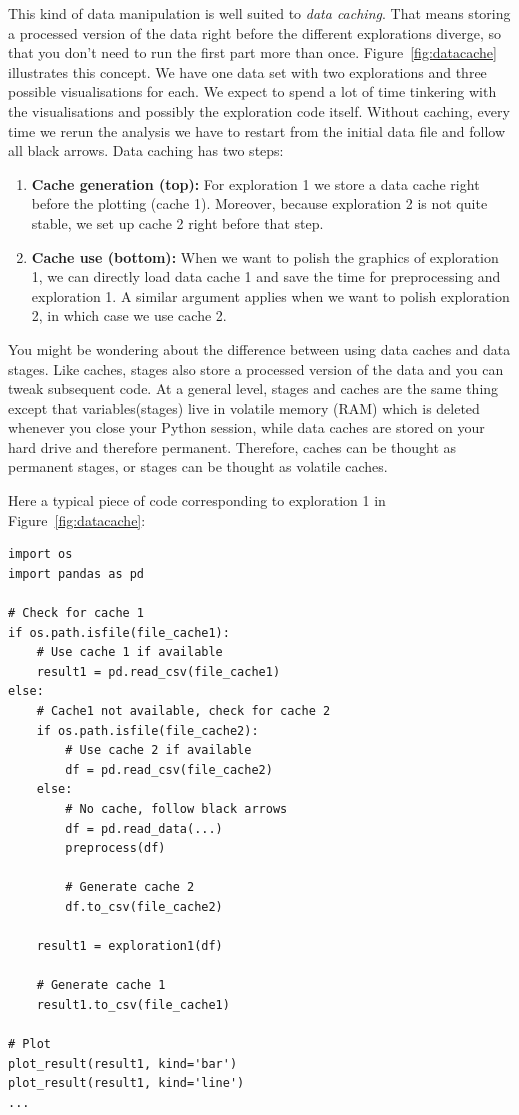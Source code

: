 \documentclass[12pt,a4paper,notitlepage,onecolumn]{article}
\begin{document}
This kind of data manipulation is well suited to \textit{data caching}. That means storing a processed version of the data right before the different explorations diverge, so that you don't need to run the first part more than once. Figure~\ref{fig:datacache} illustrates this concept. We have one data set with two explorations and three possible visualisations for each. We expect to spend a lot of time tinkering with the visualisations and possibly the exploration code itself. Without caching, every time we rerun the analysis we have to restart from the initial data file and follow all black arrows. Data caching has two steps:
\begin{enumerate}
\item \textbf{Cache generation (top):}  For exploration 1 we store a data cache right before the plotting (cache 1). Moreover, because exploration 2 is not quite stable, we set up cache 2 right before that step. 
\item \textbf{Cache use (bottom):} When we want to polish the graphics of exploration 1, we can directly load data cache 1 and save the time for preprocessing and exploration 1. A similar argument applies when we want to polish exploration 2, in which case we use cache 2.
\end{enumerate}

You might be wondering about the difference between using data caches and data stages. Like caches, stages also store a processed version of the data and you can tweak subsequent code. At a general level, stages and caches are the same thing except that variables(stages) live in volatile memory (RAM) which is deleted whenever you close your Python session, while data caches are stored on your hard drive and therefore permanent. Therefore, caches can be thought as permanent stages, or stages can be thought as volatile caches.

Here a typical piece of code corresponding to exploration 1 in Figure~\ref{fig:datacache}:

\begin{verbatim}
import os
import pandas as pd

# Check for cache 1
if os.path.isfile(file_cache1):
    # Use cache 1 if available
    result1 = pd.read_csv(file_cache1)
else:
    # Cache1 not available, check for cache 2
    if os.path.isfile(file_cache2):
        # Use cache 2 if available
        df = pd.read_csv(file_cache2)
    else:
        # No cache, follow black arrows
        df = pd.read_data(...)
        preprocess(df)

        # Generate cache 2
        df.to_csv(file_cache2)
    
    result1 = exploration1(df)

    # Generate cache 1
    result1.to_csv(file_cache1)

# Plot
plot_result(result1, kind='bar')
plot_result(result1, kind='line')
...
\end{verbatim}
\end{document}
